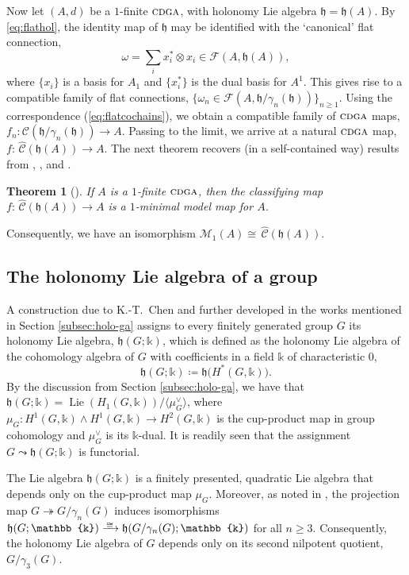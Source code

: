 \documentclass{article}
\numberwithin{equation}{section}
\newtheorem{theorem}{Theorem}[section]
\theoremstyle{definition}
\renewcommand{\k}{\mathbb{k}}
\newcommand{\cC}{\mathcal{C}}
\newcommand{\M}{\mathcal{M}}
\newcommand{\F}{\mathcal{F}}
\newcommand{\wC}{\,\widehat{\mathcal{\!C}}}
\newcommand{\h}{{\mathfrak{h}}}
\newcommand{\cdga}{\ensuremath{\textsc{cdga}}}
\DeclareMathOperator{\Lie}{Lie}
\newcommand{\surj}{\twoheadrightarrow}
\newcommand{\isom}{\xrightarrow{
   \,\smash{\raisebox{-0.4ex}{\ensuremath{\scriptstyle\cong}}}\,}}
\begin{document}
Now let $(A,d)$ be a $1$-finite $\cdga$, with holonomy Lie algebra $\h=\h(A)$. 
By \eqref{eq:flathol}, the identity map of $\h$ may be identified with 
the `canonical' flat connection, 
\begin{equation}
\label{eq:can}
\omega = \sum_i x_i^* \otimes x_i \in \F (A, \h(A)),
\end{equation}
where $\{ x_i \}$ is a basis for $A_1$ and $\{ x_i^* \}$ 
is the dual basis for $A^1$. This gives rise to a compatible 
family of flat connections, $\{ \omega_n \in \F(A, \h/\gamma_n(\h)) \}_{n\ge 1}$.
Using the correspondence (\ref{eq:flatcochains}), we obtain a compatible 
family of $\cdga$ maps, $f_n \colon \cC (\h/\gamma_n (\h)) \to A$. 
Passing to the limit, we arrive at a natural $\cdga$ map,
$f\colon \wC (\h(A)) \to  A$. 
The next theorem recovers (in a self-contained way) results 
from \cite{Bez}, \cite{BH}, and \cite{BMPP}.  

\begin{theorem}[\cite{PS-jlms}]
\label{thm:nat1model}
If $A$ is a $1$-finite $\cdga$, then 
the classifying map $f\colon \wC (\h(A)) \to A$ 
is a $1$-minimal model map for $A$.
\end{theorem}

Consequently, we have an isomorphism $\M_1(A)\cong \wC (\h(A))$.

\subsection{The holonomy Lie algebra of a group}
\label{subsec:holo lie group}
A construction due to K.-T.~Chen \cite{Chen73} and further developed in 
the works mentioned in Section \ref{subsec:holo-ga} assigns to every finitely 
generated group $G$ its holonomy Lie algebra, $\h(G;\k)$, which 
is defined as the holonomy Lie algebra of the cohomology algebra 
of $G$ with coefficients in a field $\k$ of characteristic $0$,
\begin{equation}
\label{eq:hololie-group}
\h(G;\k)\coloneqq \h\big(H^{*}(G,\k)\big).
\end{equation}
By the discussion from Section \ref{subsec:holo-ga}, we have that 
$\h(G;\k)=\Lie(H_1(G,\k))/\langle \mu_G^{\vee} \rangle$, where 
$\mu_G\colon H^1(G,\k)\wedge H^1(G,\k)\to H^2(G,\k)$ is the 
cup-product map in group cohomology and $\mu_G^{\vee}$ is 
its $\k$-dual. It is readily seen that the assignment 
$G\leadsto \h(G;\k)$ is functorial.

The Lie algebra $\h(G;\k)$ is a finitely presented, 
quadratic Lie algebra that depends only on the cup-product 
map $\mu_G$. Moreover, 
as noted in \cite{SW-jpaa}, the projection map 
$G\surj G/\gamma_n(G)$ induces isomorphisms 
$\h(G;\k)\isom \h(G/\gamma_n(G);\k)$ for all $n\ge 3$. 
Consequently, the holonomy Lie algebra of $G$ depends 
only on its second nilpotent quotient, $G/\gamma_3 (G)$.
\end{document}
